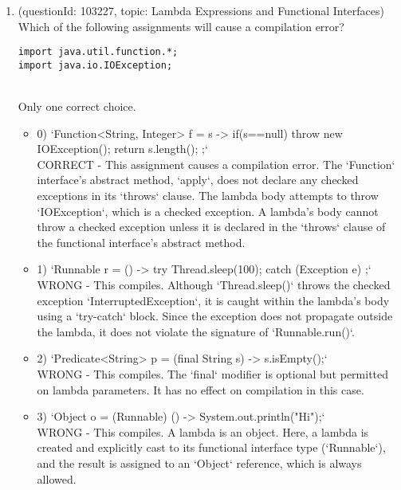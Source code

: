 \documentclass[12pt]{article}
\begin{document}
\begin{enumerate}[label=(\arabic*)]
\begin{itemize}
\end{itemize}
\item (questionId: 103227, topic: Lambda Expressions and Functional Interfaces) \\ 
Which of the following assignments will cause a compilation error?
\begin{verbatim}
import java.util.function.*;
import java.io.IOException;
\end{verbatim}
\\ \noindent Only one correct choice. 
\begin{itemize}
\item 0) `Function<String, Integer> f = s -> { if(s==null) throw new IOException(); return s.length(); };`
 \\ 
CORRECT - This assignment causes a compilation error. The `Function` interface's abstract method, `apply`, does not declare any checked exceptions in its `throws` clause. The lambda body attempts to throw `IOException`, which is a checked exception. A lambda's body cannot throw a checked exception unless it is declared in the `throws` clause of the functional interface's abstract method.

\item 1) `Runnable r = () -> { try { Thread.sleep(100); } catch (Exception e) {} };`
 \\ 
WRONG - This compiles. Although `Thread.sleep()` throws the checked exception `InterruptedException`, it is caught within the lambda's body using a `try-catch` block. Since the exception does not propagate outside the lambda, it does not violate the signature of `Runnable.run()`.

\item 2) `Predicate<String> p = (final String s) -> s.isEmpty();`
 \\ 
WRONG - This compiles. The `final` modifier is optional but permitted on lambda parameters. It has no effect on compilation in this case.

\item 3) `Object o = (Runnable) () -> System.out.println("Hi");`
 \\ 
WRONG - This compiles. A lambda is an object. Here, a lambda is created and explicitly cast to its functional interface type (`Runnable`), and the result is assigned to an `Object` reference, which is always allowed.


\end{itemize}
\end{enumerate}
\end{document}
